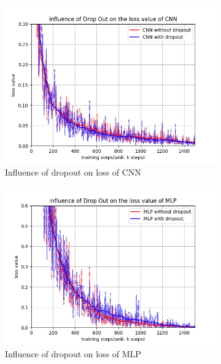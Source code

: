 \documentclass[12pt,letterpaper]{article}
\begin{document}
\begin{figure}[h]
    \medskip
    \begin{subfigure}{0.32\textwidth}
    \includegraphics[width=\linewidth]{CNN_dropout_loss.png}
    \caption{\small Influence of dropout on loss of CNN} \label{fig:c}
    \end{subfigure}\hspace*{\fill}
    \begin{subfigure}{0.32\textwidth}
    \includegraphics[width=\linewidth]{MLP_dropout_loss.png}
    \caption{\small Influence of dropout on loss of MLP} \label{fig:d}
    \end{subfigure}
    \begin{subfigure}{0.32\textwidth}

\end{subfigure}
\end{figure}
\end{document}
